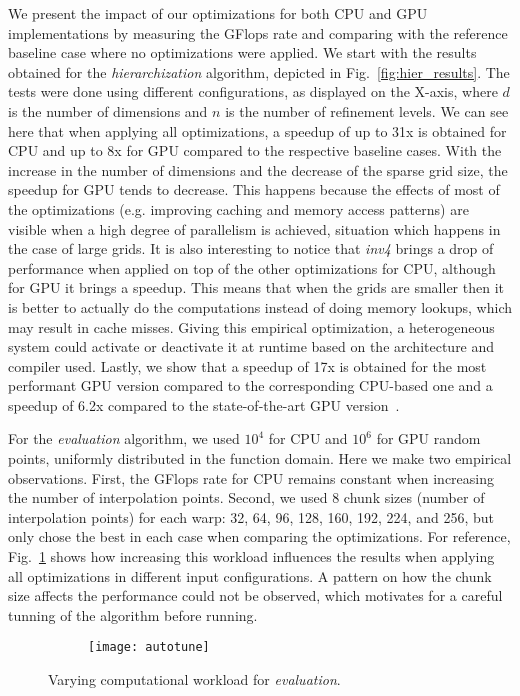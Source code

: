 We present the impact of our optimizations for both CPU and GPU implementations
by measuring the GFlops rate and comparing with the reference baseline case
where no optimizations were applied. We start with the results obtained for the
\textit{hierarchization} algorithm, depicted in Fig.~\ref{fig:hier_results}. The
tests were done using different configurations, as displayed on the X-axis,
where $d$ is the number of dimensions and $n$ is the number of refinement
levels. We can see here that when applying all optimizations, a speedup of up to
31x is obtained for CPU and up to 8x for GPU compared to the respective baseline
cases. With the increase in the number of dimensions and the decrease of the
sparse grid size, the speedup for GPU tends to decrease. This happens because
the effects of most of the optimizations (e.g. improving caching and memory
access patterns) are visible when a high degree of parallelism is achieved,
situation which happens in the case of large grids. It is also interesting to
notice that \textit{inv4} brings a drop of performance when applied on top of
the other optimizations for CPU, although for GPU it brings a speedup. This
means that when the grids are smaller then it is better to actually do the
computations instead of doing memory lookups, which may result in cache misses.
Giving this empirical optimization, a heterogeneous system could activate or
deactivate it at runtime based on the architecture and compiler used. Lastly, we
show that a speedup of 17x is obtained for the most performant GPU version
compared to the corresponding CPU-based one and a speedup of 6.2x compared to
the state-of-the-art GPU version~\cite{Murarasu:2011:CDS:1941553.1941559}.

For the \textit{evaluation} algorithm, we used $10^{4}$ for CPU and $10^{6}$
for GPU random points, uniformly distributed in the function domain. Here we
make two empirical observations. First, the GFlops rate for CPU remains constant
when increasing the number of interpolation points. Second, we used 8 chunk
sizes (number of interpolation points) for each warp: 32, 64, 96, 128, 160, 192,
224, and 256, but only chose the best in each case when comparing the
optimizations. For reference, Fig.~\ref{fig:autotune} shows how increasing this
workload influences the results when applying all optimizations in different
input configurations. A pattern on how the chunk size affects the performance
could not be observed, which motivates for a careful tunning of the algorithm
before running.

\begin{figure}[t]
  \begin{subfigure}[b]{1\linewidth}
    \centering
    \texttt{[image: autotune]}
  \end{subfigure}
  \caption{Varying computational workload for \textit{evaluation}.}
  \label{fig:autotune}
\end{figure}


